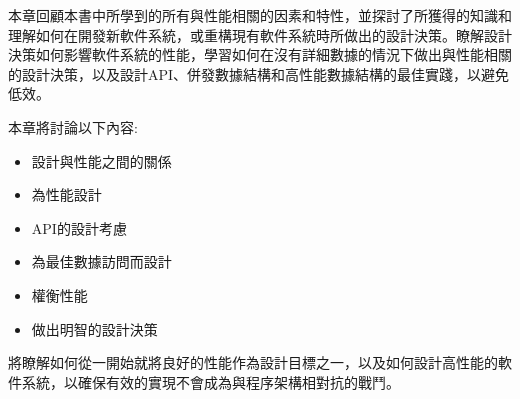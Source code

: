 本章回顧本書中所學到的所有與性能相關的因素和特性，並探討了所獲得的知識和理解如何在開發新軟件系統，或重構現有軟件系統時所做出的設計決策。瞭解設計決策如何影響軟件系統的性能，學習如何在沒有詳細數據的情況下做出與性能相關的設計決策，以及設計API、併發數據結構和高性能數據結構的最佳實踐，以避免低效。

本章將討論以下內容:

\begin{itemize}
\item 
設計與性能之間的關係

\item 
為性能設計

\item 
API的設計考慮

\item 
為最佳數據訪問而設計

\item 
權衡性能

\item 
做出明智的設計決策
\end{itemize}

將瞭解如何從一開始就將良好的性能作為設計目標之一，以及如何設計高性能的軟件系統，以確保有效的實現不會成為與程序架構相對抗的戰鬥。